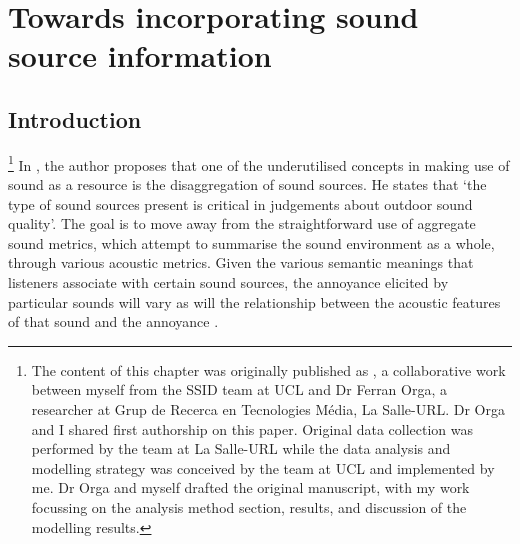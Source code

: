 \chapter{Towards incorporating sound source information}
\label{ch:mlmann}



\section{Introduction}

\footnote{The content of this chapter was originally published as \citet{Orga2021Multilevel}, a collaborative work between myself from the SSID team at UCL and Dr Ferran Orga, a researcher at Grup de Recerca en Tecnologies M{\'e}dia, La Salle-URL. Dr Orga and I shared first authorship on this paper. Original data collection was performed by the team at La Salle-URL while the data analysis and modelling strategy was conceived by the team at UCL and implemented by me. Dr Orga and myself drafted the original manuscript, with my work focussing on the analysis method section, results, and discussion of the modelling results.} In \citet{Brown2009acoustic}, the author proposes that one of the underutilised concepts in making use of sound as a resource is the disaggregation of sound sources. He states that `the type of sound sources present is critical in judgements about outdoor sound quality'. The goal is to move away from the straightforward use of aggregate sound metrics, which attempt to summarise the sound environment as a whole, through various acoustic metrics. Given the various semantic meanings that listeners associate with certain sound sources, the annoyance elicited by particular sounds will vary as will the relationship between the acoustic features of that sound and the annoyance \citep{LafayInvestigating}.

